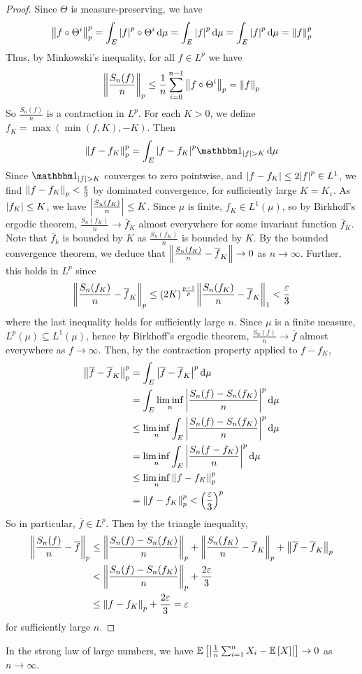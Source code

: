 \begin{proof}
	Since \( \Theta \) is measure-preserving, we have
	\[ \norm{f \circ \Theta^i}_p^p = \int_E \abs{f}^p \circ \Theta^i \dd{\mu} = \int_E \abs{f}^p \dd{\mu} = \int_E \abs{f}^p \dd{\mu} = \norm{f}_p^p \]
	Thus, by Minkowski's inequality, for all \( f \in L^p \) we have
	\[ \norm{\frac{S_n(f)}{n}}_p \leq \frac{1}{n} \sum_{i=0}^{n-1} \norm{f \circ \Theta^i}_p = \norm{f}_p \]
	So \( \frac{S_n(f)}{n} \) is a contraction in \( L^p \).
	For each \( K > 0 \), we define \( f_K = \max(\min(f, K), -K) \).
	Then
	\[ \norm{f - f_K}_p^p = \int_E \abs{f - f_K}^p \mathbbm 1_{\abs{f} > K} \dd{\mu} \]
	Since \( \mathbbm 1_{\abs{f} > K} \) converges to zero pointwise, and \( \abs{f - f_K} \leq 2\abs{f}^p \in L^1 \), we find \( \norm{f - f_K}_p < \frac{\varepsilon}{3} \) by dominated convergence, for sufficiently large \( K = K_\varepsilon \).
	As \( \abs{f_K} \leq K \), we have \( \abs{\frac{S_n(f_K)}{n}} \leq K \).
	Since \( \mu \) is finite, \( f_K \in L^1(\mu) \), so by Birkhoff's ergodic theorem, \( \frac{S_n(f_K)}{n} \to \overline f_K \) almost everywhere for some invariant function \( \overline f_K \).
	Note that \( \overline f_k \) is bounded by \( K \) as \( \frac{S_n(f_K)}{n} \) is bounded by \( K \).
	By the bounded convergence theorem, we deduce that \( \norm{\frac{S_n(f_K)}{n} - \overline f_K} \to 0 \) as \( n \to \infty \).
	Further, this holds in \( L^p \) since
	\[ \norm{\frac{S_n(f_K)}{n} - \overline f_K}_p \leq (2K)^{\frac{p-1}{p}} \norm{\frac{S_n(f_K)}{n} - \overline f_K}_1 < \frac{\varepsilon}{3} \]
	where the last inequality holds for sufficiently large \( n \).
	Since \( \mu \) is a finite measure, \( L^p(\mu) \subseteq L^1(\mu) \), hence by Birkhoff's ergodic theorem, \( \frac{S_n(f)}{n} \to \overline f \) almost everywhere as \( f \to \infty \).
	Then, by the contraction property applied to \( f - f_K \),
	\begin{align*}
		\norm{\overline f - \overline f_K}_p^p &= \int_E \abs{\overline f - \overline f_K}^p \dd{\mu} \\
		&= \int_E \liminf_n \abs{\frac{S_n(f) - S_n(f_K)}{n}}^p \dd{\mu} \\
		&\leq \liminf_n \int_E \abs{\frac{S_n(f) - S_n(f_K)}{n}}^p \dd{\mu} \\
		&= \liminf_n \int_E \abs{\frac{S_n(f - f_K)}{n}}^p \dd{\mu} \\
		&\leq \liminf_n \norm{f - f_K}_p^p \\
		&= \norm{f - f_K}_p^p < \qty(\frac{\varepsilon}{3})^p
	\end{align*}
	So in particular, \( \overline f \in L^p \).
	Then by the triangle inequality,
	\begin{align*}
			\norm{\frac{S_n(f)}{n} - \overline f}_p &\leq \norm{\frac{S_n(f) - S_n(f_K)}{n}}_p + \norm{\frac{S_n(f_K)}{n} - \overline f_K}_p + \norm{\overline f - \overline f_K}_p \\
			&< \norm{\frac{S_n(f) - S_n(f_K)}{n}}_p + \frac{2\varepsilon}{3} \\
			&\leq \norm{f - f_K}_p + \frac{2\varepsilon}{3} = \varepsilon
	\end{align*}
	for sufficiently large \( n \).
\end{proof}
\begin{corollary}
	In the strong law of large numbers, we have \( \mathbb{E}\left[{\abs{\frac{1}{n} \sum_{i=1}^n X_i - \mathbb{E}\left[{X}\right]}}\right] \to 0 \) as \( n \to \infty \).
\end{corollary}

